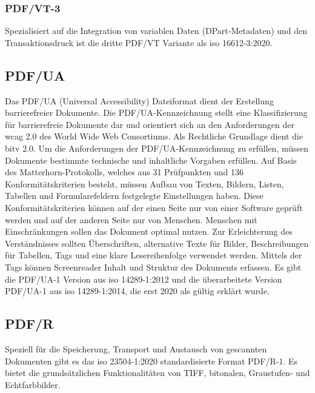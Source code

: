 \subsubsection{PDF/VT-3}
Spezialisiert auf die Integration von variablen Daten (DPart-Metadaten) und den Transaktionsdruck ist die dritte PDF/VT Variante als \gls{iso} 16612-3:2020. \cite{proj-consult}



\subsection{PDF/UA}
Das PDF/UA (Universal Accessibility) Dateiformat dient der Erstellung barrierefreier Dokumente. Die PDF/UA-Kennzeichnung stellt eine Klassifizierung für barrierefreie Dokumente dar und orientiert sich an den Anforderungen der \gls{wcag} 2.0 des World Wide Web Consortiums. Als Rechtliche Grundlage dient die \gls{bitv} 2.0. Um die Anforderungen der PDF/UA-Kennzeichnung zu erfüllen, müssen Dokumente bestimmte technische und inhaltliche Vorgaben erfüllen. Auf Basis des Matterhorn-Protokolls, welches aus 31 Prüfpunkten und 136 Konformitätskriterien besteht, müssen Aufbau von Texten, Bildern, Listen, Tabellen und Formularefeldern festgelegte Einstellungen haben. Diese Konformitätskriterien können auf der einen Seite nur von einer Software geprüft werden und auf der anderen Seite nur von Menschen. Menschen mit Einschränkungen sollen das Dokument optimal nutzen. Zur Erleichterung des Verständnisses sollten Überschriften, alternative Texte für Bilder, Beschreibungen für Tabellen, Tags und eine klare Lesereihenfolge verwendet werden. Mittels der Tags können Screenreader Inhalt und Struktur des Dokuments erfassen. \cite{adobe-pdf-ua} Es gibt die PDF/UA-1 Version aus \gls{iso} 14289-1:2012 und die überarbeitete Version PDF/UA-1 aus \gls{iso} 14289-1:2014, die erst 2020 als gültig erklärt wurde. \cite{proj-consult}


\subsection{PDF/R}
Speziell für die Speicherung, Transport und Austausch von gescannten Dokumenten gibt es das \gls{iso} 23504-1:2020 standardisierte Format PDF/R-1. Es bietet die grundsätzlichen Funktionalitäten von TIFF, bitonalen, Graustufen- und Echtfarbbilder. 
\cite{proj-consult}


